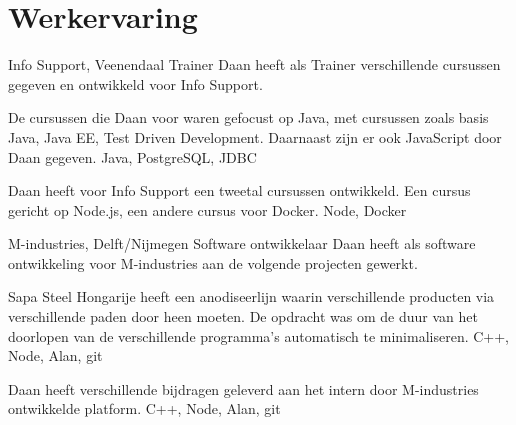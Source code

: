 \section*{Werkervaring}
  \begin{workExperience}{Info Support, Veenendaal}%
  {Trainer}{}
    Daan heeft als Trainer verschillende cursussen gegeven en ontwikkeld voor
    Info Support.

    De cursussen die Daan voor waren gefocust op Java, met cursussen zoals basis
    Java, Java EE, Test Driven Development. Daarnaast zijn er ook JavaScript
    door Daan gegeven.
    \technics Java, PostgreSQL, JDBC

    Daan heeft voor Info Support een tweetal cursussen ontwikkeld. Een cursus
    gericht op Node.js, een andere cursus voor Docker.
    \technics Node, Docker

  \end{workExperience}
	\begin{workExperience}{M-industries, Delft/Nijmegen}%
	{Software ontwikkelaar}{}
		Daan heeft als software ontwikkeling voor M-industries
                aan de volgende projecten gewerkt.

		Sapa Steel Hongarije heeft een anodiseerlijn waarin
                verschillende producten via verschillende paden door
                heen moeten.
		De opdracht was om de duur van het doorlopen van de
                verschillende programma's automatisch te
                minimaliseren.
                \technics C++, Node, Alan, git

		Daan heeft verschillende bijdragen geleverd aan het
                intern door M-industries ontwikkelde platform.
                \technics C++, Node, Alan, git

	\end{workExperience}

